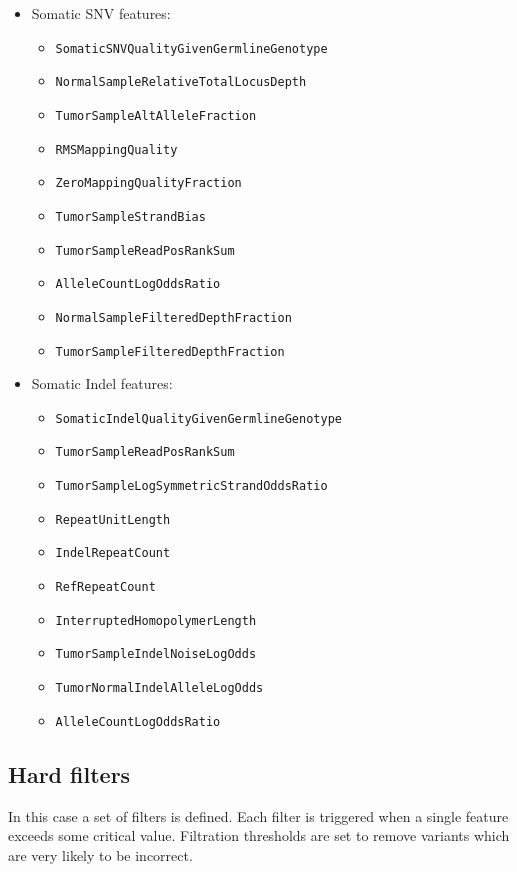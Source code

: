 \documentclass{article}
\begin{document}
\begin{itemize}
    \item Somatic SNV features:
    \begin{itemize}
        \item \texttt{SomaticSNVQualityGivenGermlineGenotype}
        \item \texttt{NormalSampleRelativeTotalLocusDepth}
        \item \texttt{TumorSampleAltAlleleFraction}
        \item \texttt{RMSMappingQuality}
        \item \texttt{ZeroMappingQualityFraction}
        \item \texttt{TumorSampleStrandBias}
        \item \texttt{TumorSampleReadPosRankSum}
        \item \texttt{AlleleCountLogOddsRatio}
        \item \texttt{NormalSampleFilteredDepthFraction}
        \item \texttt{TumorSampleFilteredDepthFraction}
    \end{itemize}
    \item Somatic Indel features:
    \begin{itemize}
        \item \texttt{SomaticIndelQualityGivenGermlineGenotype}
        \item \texttt{TumorSampleReadPosRankSum}
        \item \texttt{TumorSampleLogSymmetricStrandOddsRatio}
        \item \texttt{RepeatUnitLength}
        \item \texttt{IndelRepeatCount}
        \item \texttt{RefRepeatCount}
        \item \texttt{InterruptedHomopolymerLength}
        \item \texttt{TumorSampleIndelNoiseLogOdds}
        \item \texttt{TumorNormalIndelAlleleLogOdds}
        \item \texttt{AlleleCountLogOddsRatio}
    \end{itemize}
\end{itemize}

\subsection{Hard filters}

In this case a set of filters is defined. Each filter is triggered when a single feature exceeds some critical value. Filtration thresholds are set to remove variants which are very likely to be incorrect.
\end{document}
